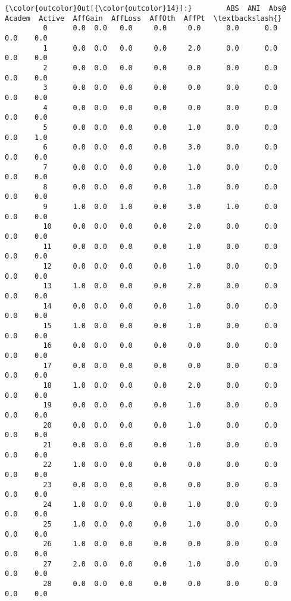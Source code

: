 \documentclass[11pt]{article}
\begin{document}
\begin{Verbatim}[commandchars=\\\{\}]
{\color{outcolor}Out[{\color{outcolor}14}]:}        ABS  ANI  Abs@  Academ  Active  AffGain  AffLoss  AffOth  AffPt  \textbackslash{}
         0      0.0  0.0   0.0     0.0     0.0      0.0      0.0     0.0    0.0   
         1      0.0  0.0   0.0     0.0     2.0      0.0      0.0     0.0    0.0   
         2      0.0  0.0   0.0     0.0     0.0      0.0      0.0     0.0    0.0   
         3      0.0  0.0   0.0     0.0     0.0      0.0      0.0     0.0    0.0   
         4      0.0  0.0   0.0     0.0     0.0      0.0      0.0     0.0    0.0   
         5      0.0  0.0   0.0     0.0     1.0      0.0      0.0     0.0    1.0   
         6      0.0  0.0   0.0     0.0     3.0      0.0      0.0     0.0    0.0   
         7      0.0  0.0   0.0     0.0     1.0      0.0      0.0     0.0    0.0   
         8      0.0  0.0   0.0     0.0     1.0      0.0      0.0     0.0    0.0   
         9      1.0  0.0   1.0     0.0     3.0      1.0      0.0     0.0    0.0   
         10     0.0  0.0   0.0     0.0     2.0      0.0      0.0     0.0    0.0   
         11     0.0  0.0   0.0     0.0     1.0      0.0      0.0     0.0    0.0   
         12     0.0  0.0   0.0     0.0     1.0      0.0      0.0     0.0    0.0   
         13     1.0  0.0   0.0     0.0     2.0      0.0      0.0     0.0    0.0   
         14     0.0  0.0   0.0     0.0     1.0      0.0      0.0     0.0    0.0   
         15     1.0  0.0   0.0     0.0     1.0      0.0      0.0     0.0    0.0   
         16     0.0  0.0   0.0     0.0     0.0      0.0      0.0     0.0    0.0   
         17     0.0  0.0   0.0     0.0     0.0      0.0      0.0     0.0    0.0   
         18     1.0  0.0   0.0     0.0     2.0      0.0      0.0     0.0    0.0   
         19     0.0  0.0   0.0     0.0     1.0      0.0      0.0     0.0    0.0   
         20     0.0  0.0   0.0     0.0     1.0      0.0      0.0     0.0    0.0   
         21     0.0  0.0   0.0     0.0     1.0      0.0      0.0     0.0    0.0   
         22     1.0  0.0   0.0     0.0     0.0      0.0      0.0     0.0    0.0   
         23     0.0  0.0   0.0     0.0     0.0      0.0      0.0     0.0    0.0   
         24     1.0  0.0   0.0     0.0     1.0      0.0      0.0     0.0    0.0   
         25     1.0  0.0   0.0     0.0     1.0      0.0      0.0     0.0    0.0   
         26     1.0  0.0   0.0     0.0     0.0      0.0      0.0     0.0    0.0   
         27     2.0  0.0   0.0     0.0     1.0      0.0      0.0     0.0    0.0   
         28     0.0  0.0   0.0     0.0     0.0      0.0      0.0     0.0    0.0   

\end{Verbatim}
\end{document}
